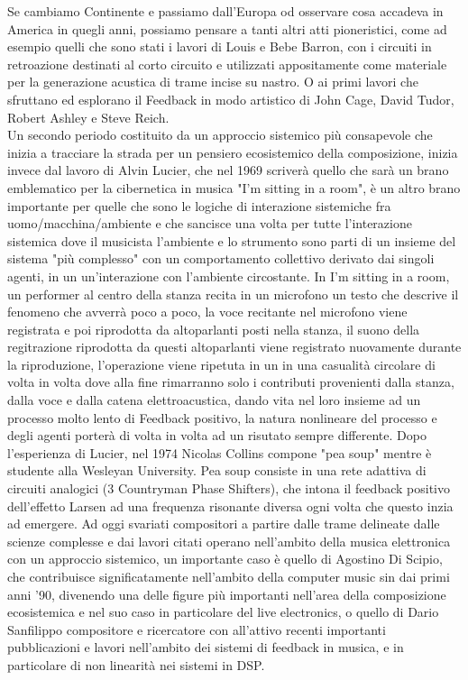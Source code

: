 % 
Se cambiamo Continente e passiamo dall'Europa od osservare cosa accadeva
in America in quegli anni, possiamo pensare a tanti altri atti pioneristici, 
come ad esempio quelli che sono stati i lavori di Louis e Bebe Barron,
con i circuiti in retroazione destinati al corto circuito
e utilizzati appositamente come materiale per la generazione acustica di trame incise su nastro.
O ai primi lavori che sfruttano ed esplorano il Feedback in modo artistico di
John Cage, David Tudor, Robert Ashley e Steve Reich. \\
Un secondo periodo costituito da un approccio sistemico più consapevole
che inizia a tracciare la strada per un pensiero ecosistemico della composizione,
inizia invece dal lavoro
di Alvin Lucier, che nel 1969 scriverà quello che sarà un brano emblematico per
la cibernetica in musica "I'm sitting in a room",
è un altro brano importante per quelle che sono
le logiche di interazione sistemiche fra uomo/macchina/ambiente
e che sancisce una volta per tutte
l'interazione sistemica dove il musicista l'ambiente e lo strumento sono parti di un insieme del sistema "più complesso" con un comportamento collettivo derivato dai singoli agenti,
in un un'interazione con l'ambiente circostante.
In I'm sitting in a room, un performer al centro della stanza
recita in un microfono un testo che descrive il fenomeno che avverrà poco a poco,
la voce recitante nel microfono viene registrata e poi riprodotta da altoparlanti
posti nella stanza, il suono della regitrazione riprodotta da questi altoparlanti
viene registrato nuovamente durante la riproduzione, l'operazione
viene ripetuta in un in una casualità circolare di volta in volta dove alla fine rimarranno
solo i contributi provenienti dalla stanza, dalla voce e dalla catena elettroacustica,
dando vita nel loro insieme ad un processo molto lento di Feedback positivo, 
la natura nonlineare del processo e degli agenti porterà di volta in volta ad un risutato
sempre differente.
Dopo l'esperienza di Lucier, nel 1974 Nicolas Collins compone "pea soup"
mentre è studente alla Wesleyan University.
Pea soup consiste in una rete adattiva di circuiti analogici (3 Countryman Phase Shifters),
che intona il feedback positivo dell'effetto Larsen ad una frequenza risonante diversa
ogni volta che questo inzia ad emergere.
Ad oggi svariati compositori a partire dalle trame delineate dalle scienze complesse e
dai lavori citati operano nell'ambito della musica elettronica con un approccio sistemico,
un importante caso è quello di Agostino Di Scipio, che contribuisce significatamente
nell'ambito della computer music sin dai primi anni '90, divenendo una
delle figure più importanti nell'area della composizione ecosistemica e nel suo
caso in particolare del live electronics, o quello di Dario Sanfilippo
compositore e ricercatore con all'attivo recenti importanti pubblicazioni e lavori
nell'ambito dei sistemi di feedback in musica, e in particolare di non linearità nei sistemi
in DSP.

